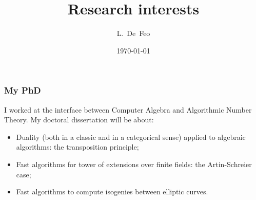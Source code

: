 \documentclass[10pt]{beamer}
\title{Research interests}
\author[L.~De~Feo]{L.~De~Feo}
\institute[TANC, LIX]{INRIA Projet TANC \& LIX École Polytechnique}
\date{\today}
\newcommand{\0}{\mathcal{O}}  %
\begin{document}
\begin{frame}
  \titlepage
\end{frame}


\begin{frame}
  \frametitle{My PhD}
  
  I worked at the interface between Computer Algebra and Algorithmic
  Number Theory. My doctoral dissertation will be about:
  \begin{itemize}
  \item Duality (both in a classic and in a categorical sense) applied
    to algebraic algorithms: the transposition principle;
  \item Fast algorithms for tower of extensions over finite fields:
    the Artin-Schreier case;
  \item Fast algorithms to compute isogenies between elliptic curves.
  \end{itemize}
\end{frame}

\end{document}
